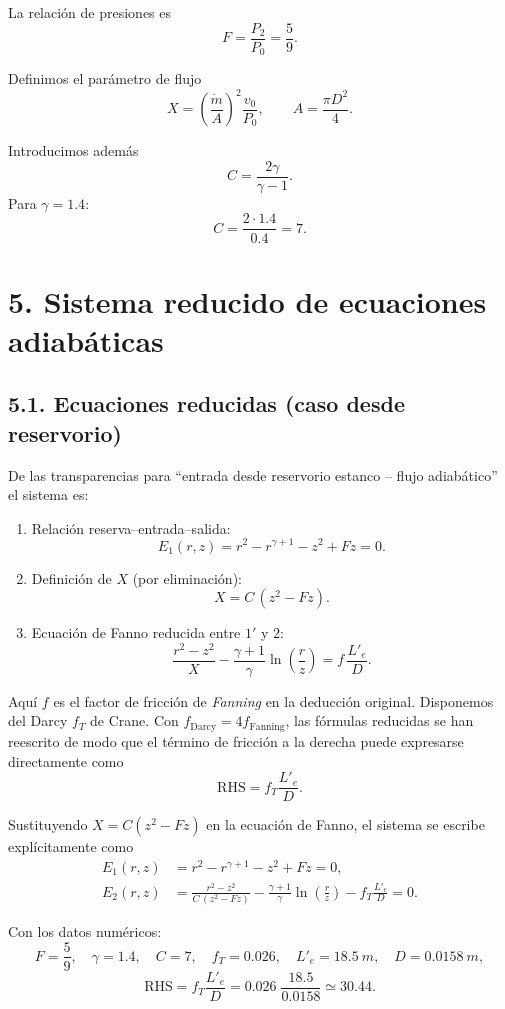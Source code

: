 \documentclass[11pt,a4paper]{article}
\begin{document}
La relación de presiones es
\[
F = \frac{P_2}{P_0} = \frac{5}{9}.
\]

Definimos el parámetro de flujo
\[
X = \left(\frac{\dot m}{A}\right)^2 \frac{v_0}{P_0}, \qquad
A = \frac{\pi D^2}{4}.
\]

Introducimos además
\[
C = \frac{2\gamma}{\gamma-1}.
\]
Para $\gamma = 1.4$:
\[
C = \frac{2\cdot 1.4}{0.4} = 7.
\]

\section*{5. Sistema reducido de ecuaciones adiabáticas}

\subsection*{5.1. Ecuaciones reducidas (caso desde reservorio)}

De las transparencias para ``entrada desde reservorio estanco -- flujo adiabático'' el sistema es:

\begin{enumerate}
\item Relación reserva--entrada--salida:
\[
E_1(r,z) = r^2 - r^{\gamma+1} - z^2 + F z = 0.
\]

\item Definición de $X$ (por eliminación):
\[
X = C\,(z^2 - F z).
\]

\item Ecuación de Fanno reducida entre $1'$ y $2$:
\[
\frac{r^2 - z^2}{X} - \frac{\gamma+1}{\gamma} \ln\!\left(\frac{r}{z}\right)
   = f\, \frac{L'_e}{D}.
\]
\end{enumerate}

Aquí $f$ es el factor de fricción de \emph{Fanning} en la deducción original.
Disponemos del Darcy $f_T$ de Crane.
Con $f_{\text{Darcy}} = 4 f_{\text{Fanning}}$, las fórmulas reducidas se han reescrito de modo que el término de fricción a la derecha puede expresarse directamente como
\[
\text{RHS} = f_T \frac{L'_e}{D}.
\]

Sustituyendo $X = C(z^2 - F z)$ en la ecuación de Fanno, el sistema se escribe explícitamente como
\begin{align*}
E_1(r,z) &=
r^2 - r^{\gamma+1} - z^2 + F z = 0, \\
E_2(r,z) &=
\frac{r^2 - z^2}{C\,(z^2 - F z)}
- \frac{\gamma+1}{\gamma} \ln\!\left(\frac{r}{z}\right)
- f_T\frac{L'_e}{D} = 0.
\end{align*}

Con los datos numéricos:
\[
F=\frac{5}{9},\quad
\gamma=1.4,\quad
C=7,\quad
f_T=0.026,\quad
L'_e=\SI{18.5}{m},\quad
D=\SI{0.0158}{m},
\]
\[
\text{RHS} = f_T \frac{L'_e}{D}
= 0.026\;\frac{18.5}{0.0158}
\simeq 30.44.
\]
\end{document}
